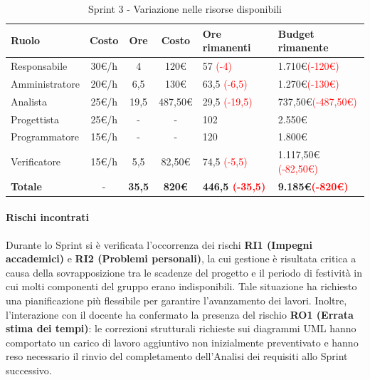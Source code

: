 \documentclass[a4paper,12pt]{article}
\begin{document}
\begin{table}[H]
    \centering
    \renewcommand{\arraystretch}{1.5}
    \begin{tabularx}{\textwidth}{|l|c|c|c|X|X|}
        \hline
        \rowcolor{tableHeader}
        \textbf{Ruolo} & \textbf{Costo} & \textbf{Ore} & \textbf{Costo} & \textbf{Ore rimanenti} & \textbf{Budget rimanente} \\
        \hline
        \rowcolor{tableLineOdd}
        Responsabile & 30\euro/h & 4 & 120\euro & 57 \textcolor{red}{(-4)} & 1.710\euro \textcolor{red}{(-120\euro)} \\
        \hline
        \rowcolor{tableLineEven}
        Amministratore & 20\euro/h & 6,5 & 130\euro & 63,5 \textcolor{red}{(-6,5)} & 1.270\euro \textcolor{red}{(-130\euro)} \\
        \hline
        \rowcolor{tableLineOdd}
        Analista & 25\euro/h & 19,5 & 487,50\euro & 29,5 \textcolor{red}{(-19,5)} & 737,50\euro \textcolor{red}{(-487,50\euro)} \\
        \hline
        \rowcolor{tableLineEven}
        Progettista & 25\euro/h & - & - & 102 & 2.550\euro \\
        \hline
        \rowcolor{tableLineOdd}
        Programmatore & 15\euro/h & - & - & 120 & 1.800\euro \\
        \hline
        \rowcolor{tableLineEven}
        Verificatore & 15\euro/h & 5,5 & 82,50\euro & 74,5 \textcolor{red}{(-5,5)} & 1.117,50\euro \textcolor{red}{(-82,50\euro)} \\
        \hline
        \rowcolor{tableHeader}
        \textbf{Totale} & - & \textbf{35,5} & \textbf{820\euro} & \textbf{446,5 \textcolor{red}{(-35,5)}} & \textbf{9.185\euro \textcolor{red}{(-820\euro)}} \\
        \hline
    \end{tabularx}
    \caption{Sprint 3 - Variazione nelle risorse disponibili}
\end{table}

\paragraph{Rischi incontrati}
Durante lo Sprint si è verificata l'occorrenza dei rischi \textbf{RI1 (Impegni accademici)} e \textbf{RI2 (Problemi personali)}, la cui gestione è risultata critica a causa della sovrapposizione tra le scadenze del progetto e il periodo di festività in cui molti componenti del gruppo erano indisponibili. Tale situazione ha richiesto una pianificazione più flessibile per garantire l'avanzamento dei lavori. Inoltre, l'interazione con il docente ha confermato la presenza del rischio \textbf{RO1 (Errata stima dei tempi)}: le correzioni strutturali richieste sui diagrammi UML hanno comportato un carico di lavoro aggiuntivo non inizialmente preventivato e hanno reso necessario il rinvio del completamento dell'Analisi dei requisiti allo Sprint successivo.
\end{document}
